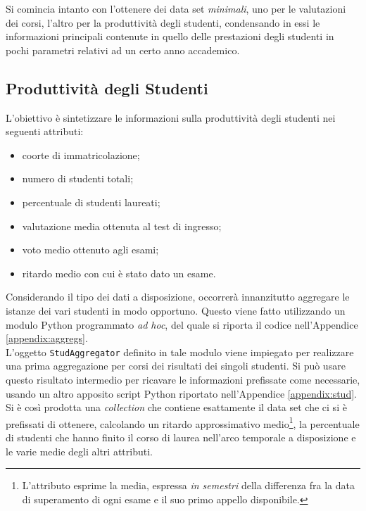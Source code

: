 	Si comincia intanto con l'ottenere dei data set \textit{minimali}, uno per le valutazioni dei corsi, l'altro per la produttività degli studenti, condensando in essi le informazioni principali contenute in quello delle prestazioni degli studenti in pochi parametri relativi ad un certo anno accademico. \\

	\subsection{Produttività degli Studenti}
	\label{prepr:stud_min}

		L'obiettivo è sintetizzare le informazioni sulla produttività degli studenti nei seguenti attributi:

		\begin{itemize}
			\item coorte di immatricolazione;
			\item numero di studenti totali;
			\item percentuale di studenti laureati;
			\item valutazione media ottenuta al test di ingresso;
			\item voto medio ottenuto agli esami;
			\item ritardo medio con cui è stato dato un esame.
		\end{itemize}

		Considerando il tipo dei dati a disposizione, occorrerà innanzitutto aggregare le istanze dei vari studenti in modo opportuno. Questo viene fatto utilizzando un modulo Python programmato \textit{ad hoc}, del quale si riporta il codice nell'Appendice \ref{appendix:aggregs}. \\
		
		L'oggetto \texttt{StudAggregator} definito in tale modulo viene impiegato per realizzare una prima aggregazione per corsi dei risultati dei singoli studenti. Si può usare questo risultato intermedio per ricavare le informazioni prefissate come necessarie, usando un altro apposito script Python riportato nell'Appendice \ref{appendix:stud}. Si è così prodotta una \textit{collection} che contiene esattamente il data set che ci si è prefissati di ottenere, calcolando un ritardo approssimativo medio\footnote{L'attributo esprime la media, espressa \textit{in semestri} della differenza fra la data di superamento di ogni esame e il suo primo appello disponibile.}, la percentuale di studenti che hanno finito il corso di laurea nell'arco temporale a disposizione e le varie medie degli altri attributi.\\

